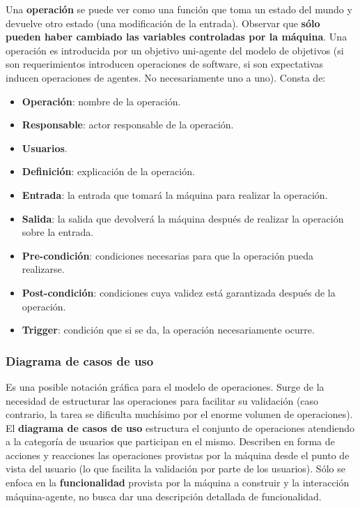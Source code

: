 \documentclass[]{article}
\begin{document}
Una \textbf{operación} se puede ver como una función que toma un estado del mundo y devuelve otro estado (una modificación de la entrada). Observar que \textbf{sólo pueden haber cambiado las variables controladas por la máquina}. Una operación es introducida por un objetivo uni-agente del modelo de objetivos (si son requerimientos introducen operaciones de software, si son expectativas inducen operaciones de agentes. No necesariamente uno a uno). Consta de:
\begin{itemize}
	\item \textbf{Operación}: nombre de la operación.
	\item \textbf{Responsable}: actor responsable de la operación.
	\item \textbf{Usuarios}.
	\item \textbf{Definición}: explicación de la operación.
	\item \textbf{Entrada}: la entrada que tomará la máquina para realizar la operación.
	\item \textbf{Salida}: la salida que devolverá la máquina después de realizar la operación sobre la entrada.
	\item \textbf{Pre-condición}: condiciones necesarias para que la operación pueda realizarse.
	\item \textbf{Post-condición}: condiciones cuya validez está garantizada después de la operación.
	\item \textbf{Trigger}: condición que si se da, la operación necesariamente ocurre.
\end{itemize}

\subsubsection{Diagrama de casos de uso}
Es una posible notación gráfica para el modelo de operaciones. Surge de la necesidad de estructurar las operaciones para facilitar su validación (caso contrario, la tarea se dificulta muchísimo por el enorme volumen de operaciones). El \textbf{diagrama de casos de uso} estructura el conjunto de operaciones atendiendo a la categoría de usuarios que participan en el mismo. Describen en forma de acciones y reacciones las operaciones provistas por la máquina desde el punto de vista del usuario (lo que facilita la validación por parte de los usuarios). Sólo se enfoca en la \textbf{funcionalidad} provista por la máquina a construir y la interacción máquina-agente, no busca dar una descripción detallada de funcionalidad.
\end{document}
